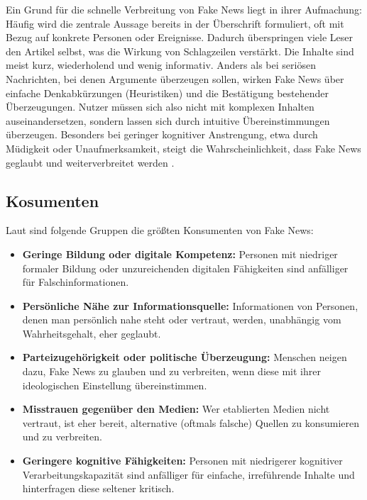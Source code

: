 Ein Grund für die schnelle Verbreitung von Fake News liegt in ihrer Aufmachung: Häufig wird die zentrale Aussage bereits in der Überschrift formuliert, 
oft mit Bezug auf konkrete Personen oder Ereignisse. Dadurch überspringen viele Leser den Artikel selbst, was die Wirkung von Schlagzeilen verstärkt. 
Die Inhalte sind meist kurz, wiederholend und wenig informativ. Anders als bei seriösen Nachrichten, bei denen Argumente überzeugen sollen, wirken Fake News über einfache Denkabkürzungen 
(Heuristiken) und die Bestätigung bestehender Überzeugungen. 
Nutzer müssen sich also nicht mit komplexen Inhalten auseinandersetzen, sondern lassen sich durch intuitive Übereinstimmungen überzeugen. 
Besonders bei geringer kognitiver Anstrengung, etwa durch Müdigkeit oder Unaufmerksamkeit, steigt die Wahrscheinlichkeit, dass Fake News geglaubt und weiterverbreitet werden \cite{horne2017}.

\subsection{Kosumenten}

Laut \cite{horne2017} sind folgende Gruppen die größten Konsumenten von Fake News:

\begin{itemize}
    \item \textbf{Geringe Bildung oder digitale Kompetenz:} Personen mit niedriger formaler Bildung oder unzureichenden digitalen Fähigkeiten sind anfälliger für Falschinformationen.
    
    \item \textbf{Persönliche Nähe zur Informationsquelle:} Informationen von Personen, denen man persönlich nahe steht oder vertraut, werden, unabhängig vom Wahrheitsgehalt, eher geglaubt.
    
    \item \textbf{Parteizugehörigkeit oder politische Überzeugung:} Menschen neigen dazu, Fake News zu glauben und zu verbreiten, wenn diese mit ihrer ideologischen Einstellung übereinstimmen.
    
    \item \textbf{Misstrauen gegenüber den Medien:} Wer etablierten Medien nicht vertraut, ist eher bereit, alternative (oftmals falsche) Quellen zu konsumieren und zu verbreiten.
    
    \item \textbf{Geringere kognitive Fähigkeiten:} Personen mit niedrigerer kognitiver Verarbeitungskapazität sind anfälliger für einfache, irreführende Inhalte und hinterfragen diese seltener kritisch.
\end{itemize}


